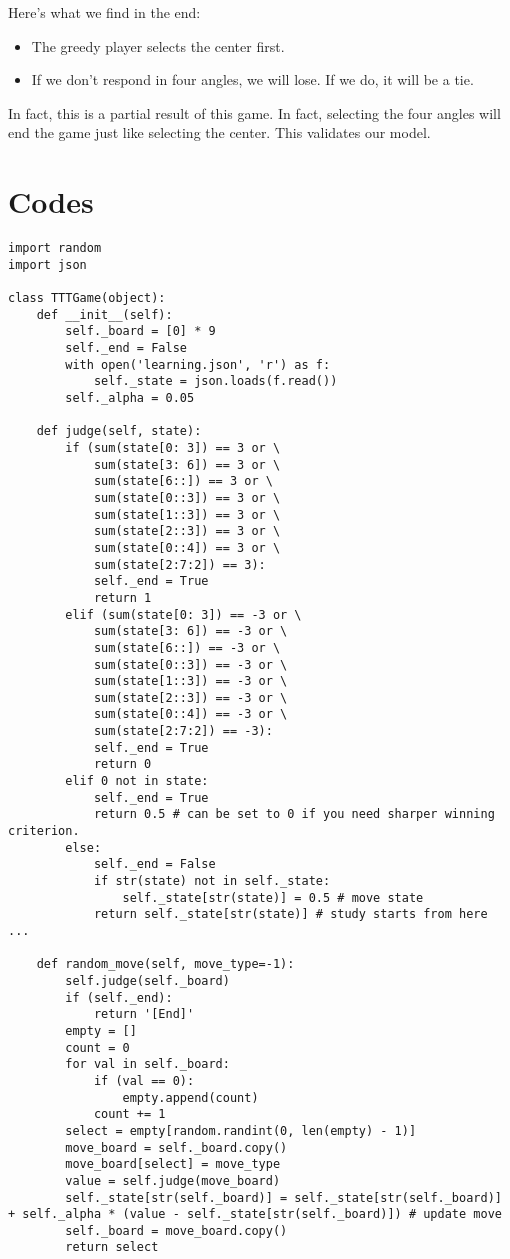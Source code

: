 \documentclass{article}
\begin{document}
Here's what we find in the end:
\begin{itemize}
    \item The greedy player selects the center first.
    \item If we don't respond in four angles, we will lose. If we do, it will be a tie. 
\end{itemize}

In fact, this is a partial result of this game. In fact, selecting the four angles will end the game just like selecting the center. This validates our model.

\appendix
\section{Codes}
\begin{verbatim}
import random
import json

class TTTGame(object):
    def __init__(self):
        self._board = [0] * 9
        self._end = False
        with open('learning.json', 'r') as f:
            self._state = json.loads(f.read())
        self._alpha = 0.05

    def judge(self, state):
        if (sum(state[0: 3]) == 3 or \
            sum(state[3: 6]) == 3 or \
            sum(state[6::]) == 3 or \
            sum(state[0::3]) == 3 or \
            sum(state[1::3]) == 3 or \
            sum(state[2::3]) == 3 or \
            sum(state[0::4]) == 3 or \
            sum(state[2:7:2]) == 3):
            self._end = True
            return 1
        elif (sum(state[0: 3]) == -3 or \
            sum(state[3: 6]) == -3 or \
            sum(state[6::]) == -3 or \
            sum(state[0::3]) == -3 or \
            sum(state[1::3]) == -3 or \
            sum(state[2::3]) == -3 or \
            sum(state[0::4]) == -3 or \
            sum(state[2:7:2]) == -3):
            self._end = True
            return 0
        elif 0 not in state:
            self._end = True
            return 0.5 # can be set to 0 if you need sharper winning criterion.
        else:
            self._end = False
            if str(state) not in self._state:
                self._state[str(state)] = 0.5 # move state
            return self._state[str(state)] # study starts from here ...

    def random_move(self, move_type=-1):
        self.judge(self._board)
        if (self._end):
            return '[End]'
        empty = []
        count = 0
        for val in self._board:
            if (val == 0):
                empty.append(count)
            count += 1
        select = empty[random.randint(0, len(empty) - 1)]
        move_board = self._board.copy()
        move_board[select] = move_type
        value = self.judge(move_board)
        self._state[str(self._board)] = self._state[str(self._board)] + self._alpha * (value - self._state[str(self._board)]) # update move 
        self._board = move_board.copy()
        return select


\end{verbatim}
\end{document}
